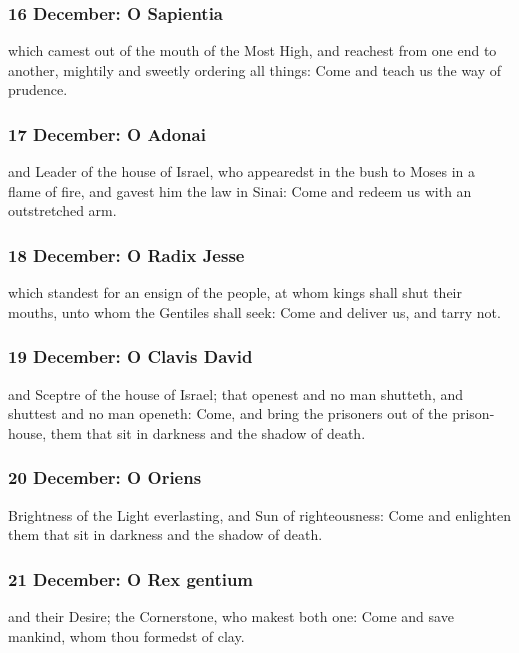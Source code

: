 \subsubsection{16 December: O Sapientia}
 {\dag} which camest out of the mouth of the Most High, and reachest from one end to another, mightily and sweetly ordering all things: Come and teach us the way of prudence.


\clearpage
\subsubsection{17 December: O Adonai}
 {\dag} and Leader of the house of Israel, who appearedst in the bush to Moses in a flame of fire, and gavest him the law in Sinai: Come and redeem us with an outstretched arm.


\subsubsection{18 December: O Radix Jesse}
 {\dag} which standest for an ensign of the people, at whom kings shall shut their mouths, unto whom the Gentiles shall seek: Come and deliver us, and tarry not.


\subsubsection{19 December: O Clavis David}
 {\dag} and Sceptre of the house of Israel; that openest and no man shutteth, and shuttest and no man openeth: Come, and bring the prisoners out of the prison-house, them that sit in darkness and the shadow of death.


\subsubsection{20 December: O Oriens}
 {\dag} Brightness of the Light everlasting, and Sun of righteousness: Come and enlighten them that sit in darkness and the shadow of death.


\subsubsection{21 December: O Rex gentium}
 {\dag} and their Desire; the Cornerstone, who makest both one: Come and save mankind, whom thou formedst of clay.

